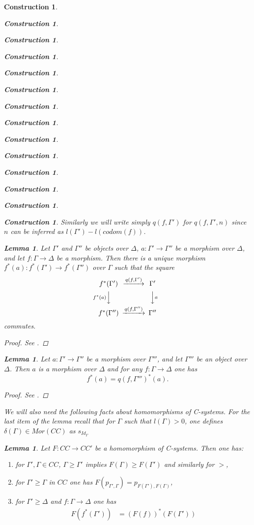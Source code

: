 \documentclass[12pt]{amsart}
\newtheorem{lemma}[proposition]{Lemma}
\numberwithin{proposition}{subsection}
\newtheorem{construction}[proposition]{Construction}
\newcommand{\llabel}[1]{\label{#1}}
\newcommand{\sr}{\rightarrow}
\begin{document}
\begin{construction}
\begin{construction}
\begin{construction}
\begin{construction}
\begin{construction}
\begin{construction}
\begin{construction}
\begin{construction}
\begin{construction}
\begin{construction}
\begin{construction}
\begin{construction}
\begin{construction}
\begin{construction}
Similarly we will write simply $q(f,\Gamma')$ for $q(f,\Gamma',n)$ since $n$ can be inferred as $l(\Gamma')-l(codom(f))$. 
%
\begin{lemma}
\llabel{2015.08.23.l1a} 
Let $\Gamma'$ and $\Gamma''$ be objects over $\Delta$,
$a:\Gamma'\sr \Gamma''$ be a morphism over $\Delta$, and let $f:\Gamma\sr\Delta$ be a
morphism. Then there is a unique morphism $f^*(a):f^*(\Gamma')\sr
f^*(\Gamma'')$ over $\Gamma$ such that the square
%
$$
\begin{CD}
f^*(\Gamma') @>q(f,\Gamma')>> \Gamma'\\
@Vf^*(a)VV @VVaV\\
f^*(\Gamma'') @>q(f,\Gamma'')>> \Gamma''
\end{CD}
$$
%
commutes.
\end{lemma}
%
\begin{proof}
See \cite[Lemma 2.13]{fromunivwithPiI}.
\end{proof}
%
\begin{lemma}
\llabel{2015.08.29.l2} 
Let $a:\Gamma'\sr\Gamma''$ be a morphism over
$\Gamma'''$, and let $\Gamma'''$ be an object over $\Delta$. Then $a$ is a morphism
over $\Delta$ and for any $f:\Gamma\sr \Delta$ one has
%
\begin{equation}\llabel{2015.08.29.eq2}
f^*(a)=q(f,\Gamma''')^*(a).
\end{equation}%
%
\end{lemma}
%
\begin{proof}
See \cite[Lemma 2.15]{fromunivwithPiI}.
\end{proof}
%
We will also need the following facts about homomorphisms of C-systems. For the
last item of the lemma recall that for $\Gamma$ such that $l(\Gamma)>0$, one
defines $\delta(\Gamma)\in Mor(CC)$ as $s_{Id_{\Gamma}}$
%
\begin{lemma}
\llabel{2015.09.03.l2}
Let $F:CC\sr CC'$ be a homomorphism of C-systems. Then one has:
%
\begin{enumerate}
\item for $\Gamma',\Gamma\in CC$, $\Gamma\ge \Gamma'$ implies $F(\Gamma)\ge F(\Gamma')$ and similarly for $>$,
\item for $\Gamma'\ge \Gamma$ in $CC$ one has $F(p_{\Gamma',\Gamma})=p_{F(\Gamma'),F(\Gamma)}$,
\item for $\Gamma'\ge \Delta$ and $f:\Gamma\sr \Delta$ one has
  \begin{equation*}
    \begin{split}
      F(f^*(\Gamma'))&=(F(f))^*(F(\Gamma')) \\

\end{split}
\end{equation*}
\end{enumerate}
\end{lemma}
\end{construction}
\end{construction}
\end{construction}
\end{construction}
\end{construction}
\end{construction}
\end{construction}
\end{construction}
\end{construction}
\end{construction}
\end{construction}
\end{construction}
\end{construction}
\end{construction}
\end{document}
